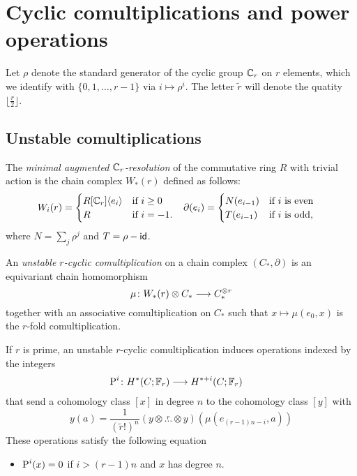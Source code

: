 
\section{Cyclic comultiplications and power operations} \label{s:2bcomultiplications}

Let $\rho$ denote the standard generator of the cyclic group $\mathbb{C}_r$ on $r$ elements, which we identify with $\{0,1,\ldots,r-1\}$ via $i\mapsto \rho^i$. The letter $\tilde{r}$ will denote the quatity $\lfloor \frac{r}{2} \rfloor$.

\subsection{Unstable comultiplications}

The \emph{minimal augmented $\mathbb{C}_r$-resolution} of the commutative ring $R$ with trivial action is the chain complex $W_*(r)$ defined as follows:
\begin{align*}
	W_i(r) &= \begin{cases}
		R[\mathbb{C}_r]\langle e_i\rangle & \text{if $i\geq 0$} \\
		R & \text{if $i=-1$}.
	\end{cases} &
	\partial(e_i) &= \begin{cases}
		N(e_{i-1}) & \text{if $i$ is even} \\
		T(e_{i-1}) & \text{if $i$ is odd,}
	\end{cases}
\end{align*}
where $N = \sum_j \rho^j$ and $T = \rho - \mathsf{id}$. %

An \emph{unstable $r$-cyclic comultiplication} on a chain complex $(C_*,\partial)$ is an equivariant chain homomorphism
\[\mu\colon W_*(r)\otimes C_*\longrightarrow C_*^{\otimes r}\]
together with an associative comultiplication on $C_*$ such that $x\mapsto \mu(e_0,x)$ is the $r$-fold comultiplication.
\begin{proposition}\label{prop:unstable}
	If $r$ is prime, an unstable $r$-cyclic comultiplication induces operations indexed by the integers
	\begin{align*}
		\operatorname{P}^{i}\colon H^*(C;\mathbb{F}_r)&\longrightarrow H^{*+i}(C;\mathbb{F}_r)
	\end{align*}
	that send a cohomology class $[x]$ in degree $n$ to the cohomology class $[y]$ with
	\[
	y(a) = \frac{1}{(\tilde{r}!)^n}(y\otimes \overset{r}{\ldots}\otimes y)(\mu(e_{(r-1)n-i},a))
	\]
	These operations satisfy the following equation
	\begin{itemize}
		\item $\operatorname{P}^i(x) = 0$ if $i>(r-1)n$ and $x$ has degree $n$.
	\end{itemize}
\end{proposition}

